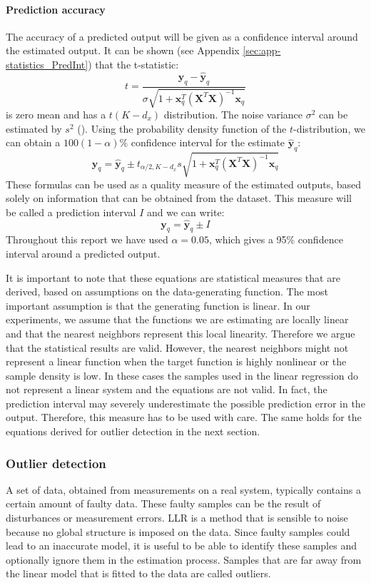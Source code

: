 \paragraph{Prediction accuracy}\label{sec:LLR-prediction interval}
The accuracy of a predicted output will be given as a confidence interval around the estimated output. It can be shown (see Appendix \ref{sec:app-statistics_PredInt}) that the t-statistic:
$$
	 t = \frac{ \mathbf{y}_q - \mathbf{\hat{y}}_q }{ \sigma \sqrt{1 + \mathbf{x}_q^T \left( \bm{X}^T \mathbf{X} \right)^{-1} \mathbf{x}_q} }
$$
is zero mean and has a $t(K-d_x)$ distribution. The noise variance $\sigma^2$ can be estimated by $s^2$ (). Using the probability density function of the $t$-distribution, we can obtain a $100(1-\alpha)\%$ confidence interval for the estimate $\mathbf{\hat{y}}_q$:
$$
	\mathbf{y}_q = \mathbf{\hat{y}}_q \pm t_{\alpha/2,K-d_x} s \sqrt{1 + \mathbf{x}_q^T \left( \bm{X}^T \bm{X} \right)^{-1} \mathbf{x}_q}
$$
These formulas can be used as a quality measure of the estimated outputs, based solely on information that can be obtained from the dataset. This measure will be called a prediction interval $I$ and we can write:
$$
	\mathbf{y}_q = \mathbf{\hat{y}}_q \pm I
$$
Throughout this report we have used $\alpha=0.05$, which gives a 95\% confidence interval around a predicted output.

It is important to note that these equations are statistical measures that are derived, based on assumptions on the data-generating function. The most important assumption is that the generating function is linear. In our experiments, we assume that the functions we are estimating are locally linear and that the nearest neighbors represent this local linearity. Therefore we argue that the statistical results are valid. However, the nearest neighbors might not represent a linear function when the target function is highly nonlinear or the sample density is low. In these cases the samples used in the linear regression do not represent a linear system  and the equations are not valid. In fact, the prediction interval may severely underestimate the possible prediction error in the output. Therefore, this measure has to be used with care. The same holds for the equations derived for outlier detection in the next section.

\subsubsection{Outlier detection}\label{sec:LLR-outlierdetection}
A set of data, obtained from measurements on a real system, typically contains a certain amount of faulty data. These faulty samples can be the result of disturbances or measurement errors. \ac{LLR} is a method that is sensible to noise because no global structure is imposed on the data. Since faulty samples could lead to an inaccurate model, it is useful to be able to identify these samples and optionally ignore them in the estimation process. Samples that are far away from the linear model that is fitted to the data are called outliers.

